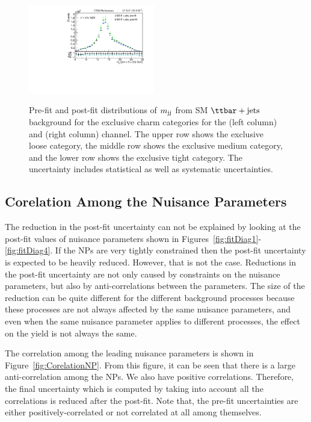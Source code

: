 \begin{figure}
{\includegraphics[width=0.49\textwidth]{Image/PostFit/ttbarPostFit_ch6.pdf}}
\caption{Pre-fit and post-fit distributions of $m_\text{jj}$ from SM $\ttjets$
    background for the exclusive charm categories for the \mujets
    (left column) and \ejets (right column) channel. The upper row
    shows the exclusive loose category, the middle row shows the exclusive
    medium category, and the lower row shows the exclusive tight category.
    The uncertainty includes statistical as well as systematic uncertainties.}
\label{fig:ttbarPostFit}
\end{figure}

\subsection{Corelation Among the Nuisance Parameters}
The reduction in the post-fit uncertainty can not be explained by looking
at the post-fit values of nuisance parameters shown in
Figures~\ref{fig:fitDiag1}-\ref{fig:fitDiag4}. If the NPs are very tightly
constrained then the post-fit uncertainty is expected to be heavily reduced.
However, that is not the case. Reductions in the post-fit uncertainty are not
only caused by constraints on the nuisance parameters, but also by
anti-correlations between the parameters. The size of the reduction can be quite
different for the different background processes because these processes are not
always affected by the same nuisance parameters, and even when the same nuisance parameter applies to different processes, the effect on the yield is not always the same.

The correlation among the leading nuisance parameters is shown in
Figure~\ref{fig:CorelationNP}. From this figure, it can be seen that there is
a large anti-correlation among the NPs. We also have positive correlations.
Therefore, the final uncertainty which is computed by taking into account
all the correlations is reduced after the post-fit. Note that, the pre-fit
uncertainties are either positively-correlated or not correlated at all among
themselves.

